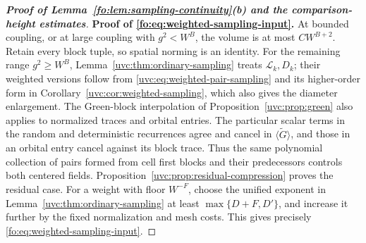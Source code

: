 \documentclass[11pt]{article}
\numberwithin{equation}{section}
\theoremstyle{remark}
\newcommand{\wt}{\widetilde}
\newcommand{\cL}{\mathcal L}
\begin{document}
\begin{proof}[\textbf{Proof of Lemma~\ref{fo:lem:sampling-continuity}(b) and the comparison-height estimates}]
\noindent\textbf{Proof of \eqref{fo:eq:weighted-sampling-input}.}
At bounded coupling, or at large coupling with $g^2<W^B$, the volume
is at most $CW^{B+2}$. Retain every block tuple, so spatial norming is
an identity. For the remaining range $g^2\ge W^B$,
Lemma~\ref{uvc:thm:ordinary-sampling} treats
$\cL_k,D_k$; their weighted versions follow from
\eqref{uvc:eq:weighted-pair-sampling} and its higher-order form in
Corollary~\ref{uvc:cor:weighted-sampling}, which also gives the diameter
enlargement. The Green-block
interpolation of Proposition~\ref{uvc:prop:green} also applies to normalized
traces and orbital entries. The particular scalar terms in the random and deterministic
recurrences agree and cancel in $\langle\wt G\rangle$, and those in
an orbital entry cancel against its block trace. Thus the same
polynomial collection of pairs formed from cell first blocks and their
predecessors controls both centered fields.
Proposition~\ref{uvc:prop:residual-compression} proves the residual case.
For a weight with floor $W^{-F}$, choose the unified exponent in
Lemma~\ref{uvc:thm:ordinary-sampling} at least $\max\{D+F,D'\}$,
and increase it further by the fixed normalization and mesh costs.
This gives precisely \eqref{fo:eq:weighted-sampling-input}.


\end{proof}
\end{document}
